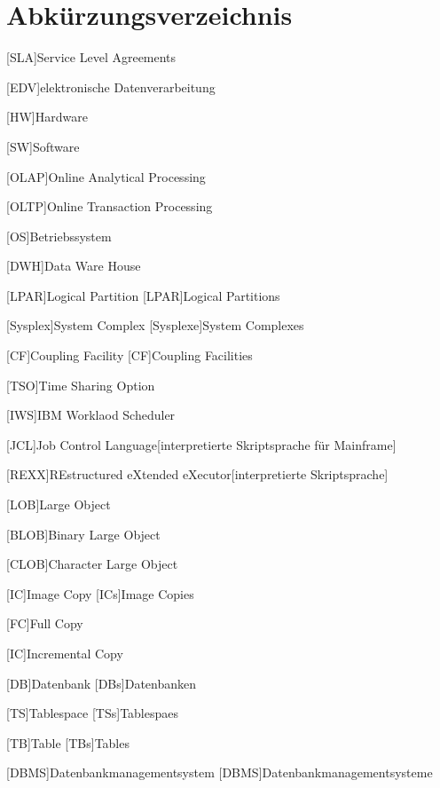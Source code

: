 \chapter*{Abkürzungsverzeichnis}
\begin{acronym}
  
  [SLA]{Service Level Agreements}
  
  [EDV]{elektronische Datenverarbeitung}
  
  [HW]{Hardware}
  
  [SW]{Software}
  
  [OLAP]{Online Analytical Processing}
  
  [OLTP]{Online Transaction Processing}
  
  [OS]{Betriebssystem}
  
  [DWH]{Data Ware House}
  
  [LPAR]{Logical Partition}
  [LPAR]{Logical Partitions}
  
  [Sysplex]{System Complex}
  [Sysplexe]{System Complexes}
  
  [CF]{Coupling Facility}
  [CF]{Coupling Facilities}
  
  [TSO]{Time Sharing Option}

  [IWS]{IBM Worklaod Scheduler}

  [JCL]{Job Control Language}[interpretierte Skriptsprache für Mainframe]
  
  [REXX]{REstructured eXtended eXecutor}[interpretierte Skriptsprache]

  [LOB]{Large Object}
  
  [BLOB]{Binary Large Object}
  
  [CLOB]{Character Large Object}
  
  [IC]{Image Copy}
  [ICs]{Image Copies}
  
  [FC]{Full Copy}
  
  [IC]{Incremental Copy}
  
  [DB]{Datenbank}
  [DBs]{Datenbanken}
  
  [TS]{Tablespace}
  [TSs]{Tablespaes}
  
  [TB]{Table}
  [TBs]{Tables}
  
  [DBMS]{Datenbankmanagementsystem}
  [DBMS]{Datenbankmanagementsysteme}
  
  
\end{acronym}


